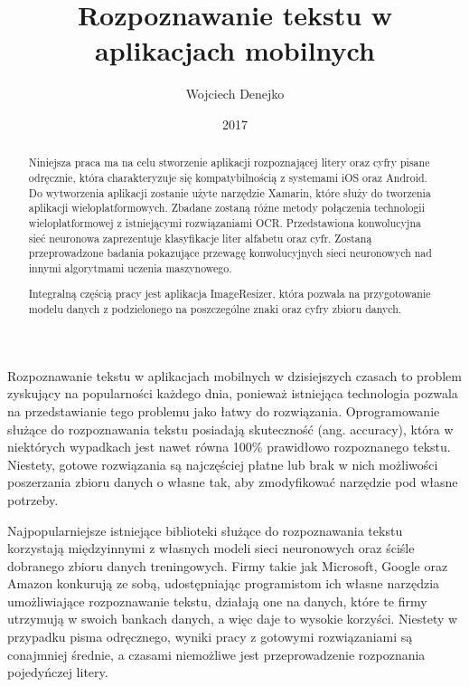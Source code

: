 \documentclass[brudnopis]{xmgr}
\author   {Wojciech Denejko}
\title    {Rozpoznawanie tekstu w aplikacjach mobilnych}
\date     {2017}
\begin{document}
\begin{abstract}
  Niniejsza praca ma na celu stworzenie aplikacji rozpoznającej litery oraz cyfry pisane odręcznie, która charakteryzuje się kompatybilnością z systemami iOS oraz Android. Do wytworzenia aplikacji zostanie użyte narzędzie Xamarin, które służy do tworzenia aplikacji wieloplatformowych. Zbadane zostaną różne metody połączenia technologii wieloplatformowej z istniejącymi rozwiązaniami OCR. Przedstawiona konwolucyjna sieć neuronowa zaprezentuje klasyfikacje liter alfabetu oraz cyfr. Zostaną przeprowadzone badania pokazujące przewagę konwolucyjnych sieci neuronowych nad innymi algorytmami uczenia maszynowego.
  
  Integralną częścią pracy jest aplikacja ImageResizer, która pozwala na przygotowanie modelu danych z podzielonego na poszczególne znaki oraz cyfry zbioru danych.
  
\end{abstract}


\maketitle

\introduction
	Rozpoznawanie tekstu w aplikacjach mobilnych w dzisiejszych czasach to problem zyskujący na popularności każdego dnia, ponieważ istniejąca technologia pozwala na przedstawianie tego problemu jako łatwy do rozwiązania. Oprogramowanie służące do rozpoznawania tekstu posiadają skuteczność (ang. accuracy), która w niektórych wypadkach jest nawet równa 100\% prawidłowo rozpoznanego tekstu. Niestety, gotowe rozwiązania są najczęściej płatne lub brak w nich możliwości poszerzania zbioru danych o własne tak, aby zmodyfikować narzędzie pod własne potrzeby.
	
	Najpopularniejsze istniejące biblioteki służące do rozpoznawania tekstu korzystają międzyinnymi z własnych modeli sieci neuronowych oraz ściśle dobranego zbioru danych treningowych. Firmy takie jak Microsoft, Google oraz Amazon konkurują ze sobą, udostępniając programistom ich własne narzędzia umożliwiające rozpoznawanie tekstu, działają one na danych, które te firmy utrzymują w swoich bankach danych, a więc daje to wysokie korzyści. Niestety w przypadku pisma odręcznego, wyniki pracy z gotowymi rozwiązaniami są conajmniej średnie, a czasami niemożliwe jest przeprowadzenie rozpoznania pojedyńczej litery.
	
\end{document}
